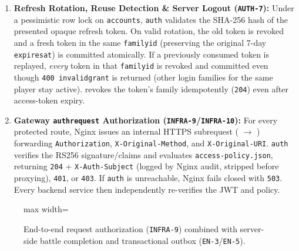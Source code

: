 \documentclass[10.5pt,a4paper]{article}
\DeclareRobustCommand{\code}[1]{\begingroup\def\_{\textunderscore\allowbreak}\texttt{#1}\endgroup}
\newcommand{\lifeline}[3]{%
  \node[draw=accent, fill=accentlight, rounded corners=2pt, minimum width=1.95cm, minimum height=0.58cm,
        font=\sffamily\scriptsize\bfseries, align=center] at (#1,0) {#2};
  \draw[rulegray, densely dashed] (#1,-0.30) -- (#1,#3);}
\newcommand{\smsg}[4]{%
  \draw[arr] (#1,#3) -- node[above, font=\ttfamily\scriptsize, align=center, inner sep=1.2pt, fill=white]{#4} (#2,#3);}
\newcommand{\srmsg}[4]{%
  \draw[darr] (#1,#3) -- node[above, font=\sffamily\scriptsize, align=center, inner sep=1.2pt, fill=white]{#4} (#2,#3);}
\newcommand{\sself}[3]{%
  \draw[arr] (#1,#2) -- ++(0.35,0) -- ++(0,-0.28) -- ++(-0.35,0);
  \node[anchor=west, font=\sffamily\scriptsize, align=left] at ($(#1,#2)+(0.40,-0.14)$) {#3};}
\newcommand{\sfrag}[6]{%
  \draw[rulegray] (#1,#2) rectangle (#3,#4);
  \node[draw=rulegray, fill=accentlight, anchor=north west, font=\sffamily\scriptsize\bfseries, inner sep=2pt] at (#1,#2) {#5};
  \node[anchor=north west, font=\sffamily\scriptsize] at ($(#1,#2)+(0.85,-0.02)$) {[#6]};}
\begin{document}
\begin{enumerate}
  \item \textbf{Refresh Rotation, Reuse Detection \& Server Logout (\code{AUTH-7}):} Under a pessimistic row lock on \code{accounts}, \code{auth} validates the SHA-256 hash of the presented opaque refresh token. On valid rotation, the old token is revoked and a fresh token in the same \code{family\_id} (preserving the original 7-day \code{expires\_at}) is committed atomically. If a previously consumed token is replayed, \emph{every} token in that \code{family\_id} is revoked and committed even though \code{400 invalid\_grant} is returned (other login families for the same player stay active).  revokes the token's family idempotently (\code{204}) even after access-token expiry.
  \item \textbf{Gateway \code{auth\_request} Authorization (\code{INFRA-9}/\code{INFRA-10}):} For every protected route, Nginx issues an internal HTTPS subrequest ( $\to$ ) forwarding \code{Authorization}, \code{X-Original-Method}, and \code{X-Original-URI}. \code{auth} verifies the RS256 signature/claims and evaluates \code{access-policy.json}, returning \code{204} + \code{X-Auth-Subject} (logged by Nginx audit, stripped before proxying), \code{401}, or \code{403}. If \code{auth} is unreachable, Nginx fails closed with \code{503}. Every backend service then independently re-verifies the JWT and policy.
\end{enumerate}

\begin{figure}[H]
\centering
\begin{adjustbox}{max width=\linewidth}
\end{adjustbox}
\caption{End-to-end request authorization (\code{INFRA-9}) combined with server-side battle completion and transactional outbox (\code{EN-3}/\code{EN-5}).}
\label{fig:seq-flows}
\end{figure}
\end{document}
